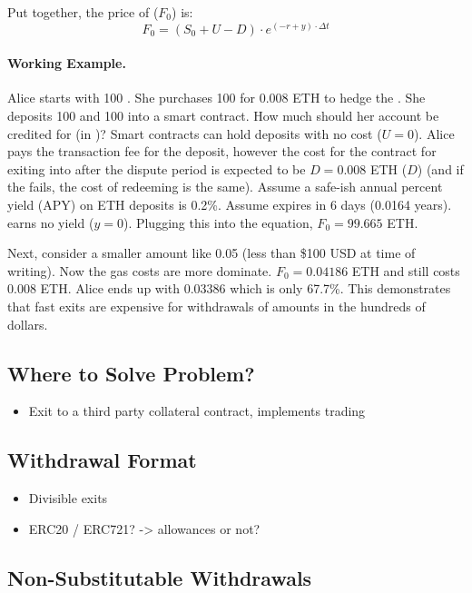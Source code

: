 Put together, the price of \ethxx ($F_0$) is: \[ F_0 = (S_0 + U - D)\cdot e^{(-r+y)\cdot\Delta t} \]

\paragraph{Working Example.} Alice starts with 100 \ethxx. She purchases 100 \fail for $0.008$ ETH to hedge the \ethxx. She deposits 100 \ethxx and 100 \fail into a smart contract. How much should her account be credited for (in \ethone)? Smart contracts can hold deposits with no cost ($U=0$). Alice pays the transaction fee for the deposit, however the cost for the contract for exiting \ethxx into \ethone after the dispute period is expected to be $D=0.008$ ETH ($D$) (and if the \rblock fails, the cost of redeeming \fail is the same). Assume a safe-ish annual percent yield (APY) on ETH deposits is 0.2\%. Assume \ethxx expires in 6 days (0.0164 years). \ethxx earns no yield ($y=0$). Plugging this into the equation, $F_0=99.665$ ETH.

Next, consider a smaller amount like 0.05 \ethxx (less than \$100 USD at time of writing). Now the gas costs are more dominate. $F_0=0.04186$ ETH and \fail still costs $0.008$ ETH. Alice ends up with 0.03386 \ethone which is only 67.7\%. This demonstrates that fast exits are expensive for withdrawals of amounts in the hundreds of dollars.


\subsection{Where to Solve Problem? }
\begin{itemize}
\item Exit to a third party collateral contract, implements trading
\end{itemize}

\subsection{Withdrawal Format }
\begin{itemize}
\item Divisible exits
\item ERC20 / ERC721? -> allowances or not? 
\end{itemize}

\subsection{Non-Substitutable Withdrawals}

